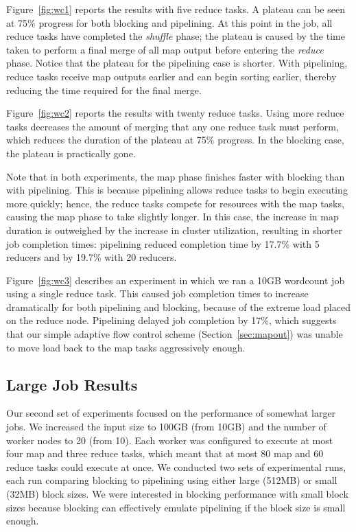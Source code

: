 Figure~\ref{fig:wc1} reports the results with five reduce tasks. A plateau can
be seen at 75\% progress for both blocking and pipelining. At this point in the
job, all reduce tasks have completed the {\em shuffle} phase; the plateau is
caused by the time taken to perform a final merge of all map output before
entering the {\em reduce} phase. Notice that the plateau for the pipelining case
is shorter. With pipelining, reduce tasks receive map outputs earlier and can
begin sorting earlier, thereby reducing the time required for the final merge.

Figure~\ref{fig:wc2} reports the results with twenty reduce tasks. Using more
reduce tasks decreases the amount of merging that any one reduce task must
perform, which reduces the duration of the plateau at 75\% progress. In the
blocking case, the plateau is practically gone.%

Note that in both experiments, the map phase finishes faster with blocking than
with pipelining. This is because pipelining allows reduce tasks to begin
executing more quickly; hence, the reduce tasks compete for resources with the
map tasks, causing the map phase to take slightly longer. In this case, the
increase in map duration is outweighed by the increase in cluster utilization,
resulting in shorter job completion times: pipelining reduced completion time by
17.7\% with 5 reducers and by 19.7\% with 20 reducers.

Figure~\ref{fig:wc3} describes an experiment in which we ran a 10GB wordcount
job using a single reduce task. This caused job completion times to increase
dramatically for both pipelining and blocking, because of the extreme load
placed on the reduce node. Pipelining delayed job completion by
\texttildelow{}17\%, which suggests that our simple adaptive flow control scheme
(Section~\ref{sec:mapout}) was unable to move load back to the map tasks
aggressively enough.

\subsection{Large Job Results}
Our second set of experiments focused on the performance of somewhat larger
jobs. We increased the input size to 100GB (from 10GB) and the number of worker
nodes to 20 (from 10). Each worker was configured to execute at most four map
and three reduce tasks, which meant that at most 80 map and 60 reduce tasks
could execute at once. We conducted two sets of experimental runs, each run
comparing blocking to pipelining using either large (512MB) or small (32MB)
block sizes. We were interested in blocking performance with small block sizes
because blocking can effectively emulate pipelining if the block size is small
enough.

